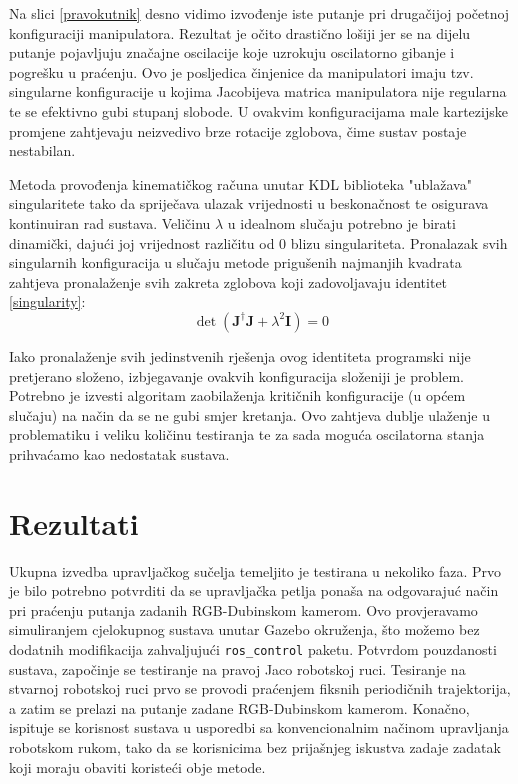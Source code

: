 \documentclass[times, utf8, diplomski, numeric]{fer}
\begin{document}

Na slici \ref{pravokutnik} desno vidimo izvođenje iste putanje pri drugačijoj početnoj konfiguraciji manipulatora.
Rezultat je očito drastično lošiji jer se na dijelu putanje pojavljuju značajne oscilacije koje uzrokuju oscilatorno gibanje i pogrešku u praćenju.
Ovo je posljedica činjenice da manipulatori imaju tzv. singularne konfiguracije u kojima Jacobijeva matrica manipulatora nije regularna te se efektivno gubi stupanj slobode.
U ovakvim konfiguracijama male kartezijske promjene zahtjevaju neizvedivo brze rotacije zglobova, čime sustav postaje nestabilan.

Metoda provođenja kinematičkog računa unutar KDL biblioteka "ublažava" singularitete tako da spriječava ulazak vrijednosti u beskonačnost te osigurava kontinuiran rad sustava.
Veličinu $\lambda$ u idealnom slučaju potrebno je birati dinamički, dajući joj vrijednost različitu od $0$ blizu singulariteta.
Pronalazak svih singularnih konfiguracija u slučaju metode prigušenih najmanjih kvadrata zahtjeva pronalaženje svih zakreta zglobova koji zadovoljavaju identitet \ref{singularity}:
\begin{equation}
\det \left(\mathbf{J}^{\dagger} \mathbf{J} + \lambda^2\mathbf{I}\right) =0
\label{singularity}
\end{equation}

Iako pronalaženje svih jedinstvenih rješenja ovog identiteta programski nije pretjerano složeno, izbjegavanje ovakvih konfiguracija složeniji je problem.
Potrebno je izvesti algoritam zaobilaženja kritičnih konfiguracije (u općem slučaju) na način da se ne gubi smjer kretanja.
Ovo zahtjeva dublje ulaženje u problematiku i veliku količinu testiranja te za sada moguća oscilatorna stanja prihvaćamo kao nedostatak sustava.


\chapter{Rezultati}
Ukupna izvedba upravljačkog sučelja temeljito je testirana u nekoliko faza. 
Prvo je bilo potrebno potvrditi da se upravljačka petlja ponaša na odgovarajuć način pri praćenju putanja zadanih RGB-Dubinskom kamerom.
Ovo provjeravamo simuliranjem cjelokupnog sustava unutar Gazebo okruženja, što možemo bez dodatnih modifikacija zahvaljujući \texttt{ros\_control} paketu.
Potvrdom pouzdanosti sustava, započinje se testiranje na pravoj Jaco robotskoj ruci.
Tesiranje na stvarnoj robotskoj ruci prvo se provodi praćenjem fiksnih periodičnih trajektorija, a zatim se prelazi na putanje zadane RGB-Dubinskom kamerom.
Konačno, ispituje se korisnost sustava u usporedbi sa konvencionalnim načinom upravljanja robotskom rukom, tako da se korisnicima bez prijašnjeg iskustva zadaje zadatak koji moraju obaviti koristeći obje metode.
\end{document}
